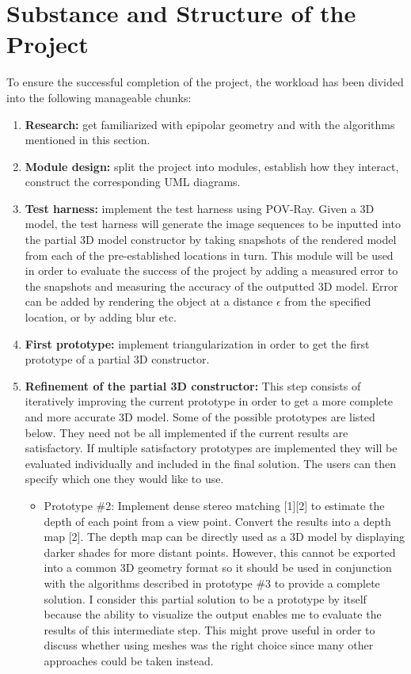 \section*{Substance and Structure of the Project}
To ensure the successful completion of the project, the workload has been divided into the following manageable chunks:
\begin{enumerate}
\item {\bf Research:} get familiarized with epipolar geometry and with the algorithms mentioned in this section. 
\item {\bf Module design:} split the project into modules, establish how they interact, construct the corresponding UML diagrams. 
\item {\bf Test harness:} implement the test harness using POV-Ray. Given a 3D model, the test harness will generate the image sequences to be inputted into the partial 3D model constructor by taking snapshots of the rendered model from each of the pre-established locations in turn. This module will be used in order to evaluate the success of the project by adding a measured error to the snapshots and measuring the accuracy of the outputted 3D model. Error can be added by rendering the object at a distance $\epsilon$ from the specified location, or by adding blur etc.
\item {\bf First prototype:} implement triangularization in order to get the first prototype of a partial 3D constructor.
\item {\bf Refinement of the partial 3D constructor:} This step consists of iteratively improving the current prototype in order to get a more complete and more accurate 3D model. Some of the possible prototypes are listed below. They need not be all implemented if the current results are satisfactory. If multiple satisfactory prototypes are implemented they will be evaluated individually and included in the final solution. The users can then specify which one they would like to use. 
	\begin{itemize}
	\item Prototype \#{2}: Implement dense stereo matching [1][2] to estimate the depth of each point from a view point. Convert the results into a depth map [2]. The depth map can be directly used as a 3D model by displaying darker shades for more distant points. However, this cannot be exported into a common 3D geometry format so it should be used in conjunction with the algorithms described in prototype \#{3} to provide a complete solution. I consider this partial solution to be a prototype by itself because the ability to visualize the output enables me to evaluate the results of this intermediate step. This might prove useful in order to discuss whether using meshes was the right choice since many other approaches could be taken instead.

\end{itemize}
\end{enumerate}
